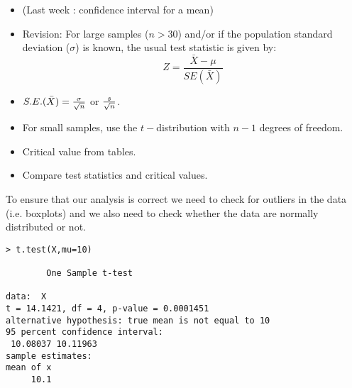 \begin{itemize}
\item (Last week : confidence interval for a mean) \item Revision:
For large samples ($n > 30$) and/or if the population standard
deviation ($\sigma$) is known, the usual test statistic is given
by: \[Z =\frac{\bar{X} - \mu}{SE(\bar{X})}\]

\item $S.E.(\bar{X}) = { \sigma \over \sqrt{n}} $ or ${s \over \sqrt{n}}$. 
\item For small samples, use the $t-$distribution with $n-1$ degrees of freedom.
\item Critical value from tables.
\item Compare test statistics and critical values.
\end{itemize}

To ensure that our analysis is correct we need to check for
outliers in the data (i.e. boxplots) and we also need to check
whether the data are normally distributed or not.

\begin{framed}
\begin{verbatim}
> t.test(X,mu=10)

        One Sample t-test

data:  X 
t = 14.1421, df = 4, p-value = 0.0001451
alternative hypothesis: true mean is not equal to 10 
95 percent confidence interval:
 10.08037 10.11963 
sample estimates:
mean of x 
     10.1 
\end{verbatim}
\end{framed}
